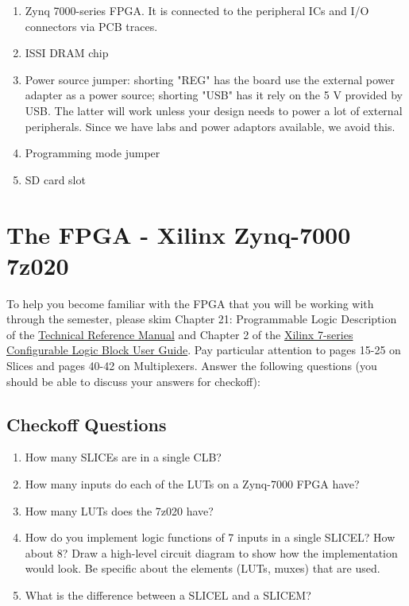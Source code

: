 \documentclass[11pt]{article}
\begin{document}
\begin{enumerate}
	\item Zynq 7000-series FPGA. It is connected to the peripheral ICs and I/O connectors via PCB traces.
	\item ISSI DRAM chip
	\item Power source jumper: shorting "REG" has the board use the external power adapter as a power source; shorting "USB" has it rely on the 5 V provided by USB. The latter will work unless your design needs to power a lot of external peripherals. Since we have labs and power adaptors available, we avoid this.
	\item Programming mode jumper
	\item SD card slot
\end{enumerate}

\section{The FPGA - Xilinx Zynq-7000 7z020}
To help you become familiar with the FPGA that you will be working with through the semester, please skim Chapter 21: Programmable Logic Description of the \href{https://www.xilinx.com/support/documentation/user_guides/ug585-Zynq-7000-TRM.pdf}{Technical Reference Manual} and Chapter 2 of the \href{http://www.xilinx.com/support/documentation/user_guides/ug474_7Series_CLB.pdf}{Xilinx 7-series Configurable Logic Block User Guide}. Pay particular attention to pages 15-25 on Slices and pages 40-42 on Multiplexers. Answer the following questions (you should be able to discuss your answers for checkoff):

\subsection{Checkoff Questions}
\begin{enumerate}
	\item How many SLICEs are in a single CLB?
	\item How many inputs do each of the LUTs on a Zynq-7000 FPGA have?
	\item How many LUTs does the 7z020 have?
	\item How do you implement logic functions of 7 inputs in a single SLICEL? How about 8? Draw a high-level circuit diagram to show how the implementation would look. Be specific about the elements (LUTs, muxes) that are used.
	\item What is the difference between a SLICEL and a SLICEM?
\end{enumerate}
\end{document}
